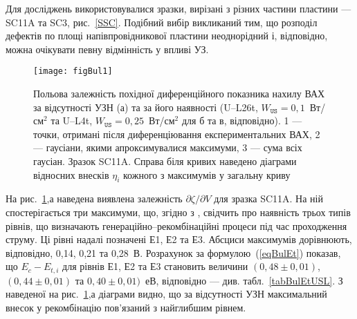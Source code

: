 Для досліджень використовувалися зразки, вирізані з різних частини пластини --- SC11A та SC3, рис.~\ref{SSC}.
Подібний вибір викликаний тим, що розподіл дефектів по площі напівпровідникової пластини неоднорідний і, відповідно, можна очікувати певну відмінність у впливі УЗ.

\begin{figure}
\center
\texttt{[image: figBul1]}
\caption{\label{figBul1}
Польова залежність похідної диференційного показника нахилу ВАХ за відсутності УЗН (а)
та за його наявності (U--L26t, $W_\mathtt{US}=0,1$~Вт/см$^2$ та U--L4t,  $W_\mathtt{US}=0,25$~Вт/см$^2$ для б та в, відповідно).
1 --- точки, отримані після диференціювання експериментальних ВАХ,
2 --- гаусіани, якими апроксимувалися максимуми,
3 --- сума всіх гаусіан.
Зразок SC11A.
Справа біля кривих наведено діаграми відносних внесків $\eta_i$ кожного з максимумів у загальну криву
}%
\end{figure}

На рис.~\ref{figBul1},а наведена виявлена залежність $\partial \zeta/ \partial V $ для зразка SC11A.
На ній спостерігається три максимуми, що, згідно з \cite{Bulyar}, свідчить про наявність
трьох типів рівнів, що визначають генераційно--рекомбінаційні процеси під час проходження струму.
Ці рівні надалі позначені Е1, Е2 та Е3.
Абсциси максимумів дорівнюють, відповідно, 0,14, 0,21 та 0,28~В.
Розрахунок за формулою~(\ref{eqBulEt}) показав,
що  $E_c-E_{t,i}$ для рівнів  Е1, Е2 та Е3 становить величини $(0,48\pm0,01)$, $(0,44\pm0,01)$ та $0,40\pm0,01)$~еВ, відповідно --- див. табл.~\ref{tabBulEtUSL}.
З наведеної на рис.~\ref{figBul1},а діаграми видно, що за відсутності УЗН максимальний внесок у рекомбінацію пов'язаний з найглибшим рівнем.





